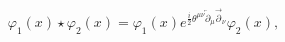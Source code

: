 \begin{equation}
\varphi_{1}(x)\star\varphi_{2}(x)=\varphi_{1}(x)e^{\frac{i}{2}\theta^{\mu\nu
}\overleftarrow{\partial}_{\mu}\overrightarrow{\partial}_{\nu}}\varphi_{2}(x),
\label{mp}%
\end{equation}

